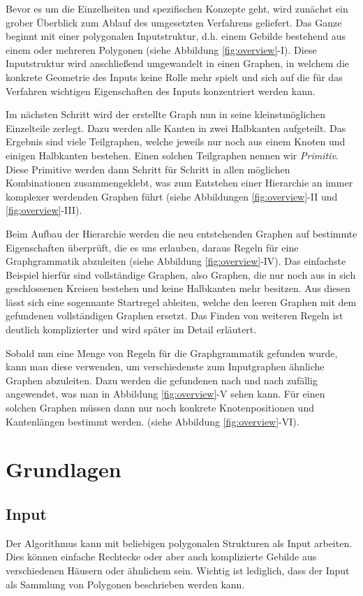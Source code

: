 Bevor es um die Einzelheiten und spezifischen Konzepte geht, wird zunächst ein grober Überblick zum Ablauf des umgesetzten
Verfahrens geliefert. Das Ganze beginnt mit einer polygonalen Inputstruktur, d.h. einem Gebilde bestehend aus einem oder mehreren Polygonen
(siehe Abbildung \ref{fig:overview}-I).
Diese Inputstruktur wird anschließend umgewandelt in einen Graphen, in welchem die konkrete Geometrie des Inputs keine Rolle
mehr spielt und sich auf die für das Verfahren wichtigen Eigenschaften des Inputs konzentriert werden kann.

Im nächsten Schritt wird der erstellte Graph nun in seine kleinstmöglichen Einzelteile zerlegt. Dazu werden alle Kanten in zwei Halbkanten
aufgeteilt. Das Ergebnis sind viele Teilgraphen, welche jeweils nur noch aus einem Knoten und einigen Halbkanten bestehen.
Einen solchen Teilgraphen nennen wir \textit{Primitiv}. Diese Primitive werden dann Schritt für Schritt in allen möglichen Kombinationen
zusammengeklebt, was zum Entstehen einer Hierarchie an immer komplexer werdenden Graphen führt (siehe Abbildungen \ref{fig:overview}-II und
\ref{fig:overview}-III).

Beim Aufbau der Hierarchie werden die neu entstehenden Graphen auf bestimmte
Eigenschaften überprüft, die es uns erlauben, daraus Regeln für eine Graphgrammatik abzuleiten (siehe Abbildung \ref{fig:overview}-IV).
Das einfachste Beispiel hierfür sind
vollständige Graphen, also Graphen, die nur noch aus in sich geschlossenen Kreisen bestehen und keine Halbkanten mehr besitzen. Aus diesen lässt
sich eine sogennante Startregel ableiten, welche den leeren Graphen mit dem gefundenen vollständigen Graphen ersetzt. Das Finden von weiteren
Regeln ist deutlich komplizierter und wird später im Detail erläutert.

Sobald nun eine Menge von Regeln für die Graphgrammatik gefunden wurde, kann man diese verwenden, um verschiedenste zum Inputgraphen
ähnliche Graphen abzuleiten. Dazu werden die gefundenen nach und nach zufällig angewendet, was man in Abbildung \ref{fig:overview}-V sehen kann.
Für einen solchen Graphen müssen dann nur noch konkrete Knotenpositionen und Kantenlängen bestimmt werden. (siehe Abbildung \ref{fig:overview}-VI).

\section{Grundlagen}
\subsection{Input}
\label{chap:input}
Der Algorithmus kann mit beliebigen polygonalen Strukturen als Input arbeiten. Dies können einfache Rechtecke oder aber auch komplizierte Gebilde
aus verschiedenen Häusern oder ähnlichem sein. Wichtig ist lediglich, dass der Input als Sammlung von Polygonen beschrieben werden kann.

